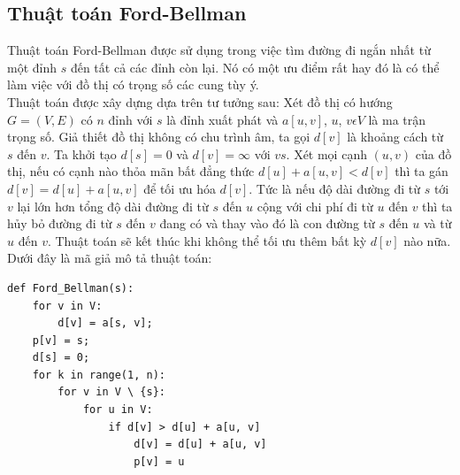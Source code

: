 \documentclass[a4paper,12pt]{report}
\begin{document}
\subsection{Thuật toán Ford-Bellman}
	Thuật toán Ford-Bellman được sử dụng trong việc tìm đường đi ngắn nhất từ một đỉnh $s$ đến tất cả các đỉnh còn lại. Nó có một ưu điểm rất hay đó là có thể làm việc với đồ thị có trọng số các cung tùy ý.\\
	Thuật toán được xây dựng dựa trên tư tưởng sau: Xét đồ thị có hướng $ G = (V, E) $ có $n$ đỉnh với $s$ là đỉnh xuất phát và $ a[u, v] $, $u$, $ v \epsilon V $ là ma trận trọng số. Giả thiết đồ thị không có chu trình âm, ta gọi $ d[v] $ là khoảng cách từ $s$ đến $v$. Ta khởi tạo $ d[s] = 0 $ và $ d[v] = \infty $ với $ v  s $. Xét mọi cạnh $ (u, v) $ của đồ thị, nếu có cạnh nào thỏa mãn bất đẳng thức $ d[u] + a[u, v] < d[v] $ thì ta gán $ d[v] = d[u] + a[u, v] $ để tối ưu hóa $ d[v] $. Tức là nếu độ dài đường đi từ $s$ tới $v$ lại lớn hơn tổng độ dài đường đi từ $s$ đến $u$ cộng với chi phí đi từ $u$ đến $v$ thì ta hủy bỏ đường đi từ $s$ đến $v$ đang có và thay vào đó là con đường từ $s$ đến $u$ và từ $u$ đến $v$. Thuật toán sẽ kết thúc khi không thể tối ưu thêm bất kỳ $d[v]$ nào nữa. Dưới đây là mã giả mô tả thuật toán:\\

\begin{verbatim}	
def Ford_Bellman(s):
    for v in V:
        d[v] = a[s, v];
	p[v] = s;
    d[s] = 0;
    for k in range(1, n):
        for v in V \ {s}:
            for u in V:
                if d[v] > d[u] + a[u, v]
                    d[v] = d[u] + a[u, v]
                    p[v] = u
\end{verbatim}
\end{document}
